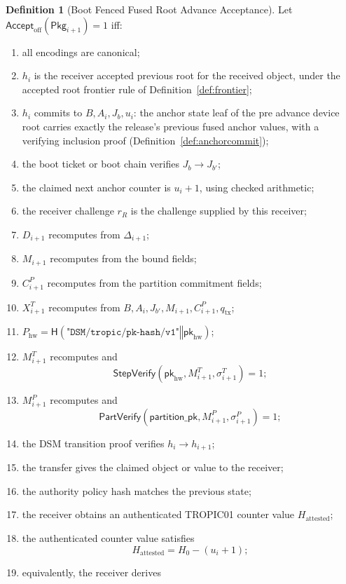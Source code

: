 \documentclass[11pt]{article}
\theoremstyle{definition}
\newtheorem{definition}[theorem]{Definition}
\theoremstyle{remark}
\newcommand{\concat}{\ensuremath{\mathbin{\Vert}}}
\newcommand{\Hf}{\ensuremath{\mathsf{H}}}
\newcommand{\StepVerify}{\ensuremath{\mathsf{StepVerify}}}
\newcommand{\PartVerify}{\ensuremath{\mathsf{PartVerify}}}
\newcommand{\ctx}[1]{\texttt{"#1"}}
\newcommand{\Pkg}{\ensuremath{\mathsf{Pkg}}}
\newcommand{\Bundle}{\ensuremath{B}}
\newcommand{\Ahead}{\ensuremath{A}}
\newcommand{\Bhead}{\ensuremath{J}}
\newcommand{\pkhw}{\ensuremath{\mathsf{pk}_{\mathrm{hw}}}}
\newcommand{\pkh}{\ensuremath{P_{\mathrm{hw}}}}
\begin{document}
\begin{definition}[Boot Fenced Fused Root Advance Acceptance]
Let \(\mathsf{Accept}_{\mathrm{off}}(\Pkg_{i+1})=1\) iff:

\begin{enumerate}[label=(\arabic*),leftmargin=2em]
\item all encodings are canonical;
\item \(h_i\) is the receiver accepted previous root for the received object, under the accepted
root frontier rule of Definition~\ref{def:frontier};
\item \(h_i\) commits to \(\Bundle,\Ahead_i,\Bhead_b,u_i\): the anchor state leaf of the pre
advance device root carries exactly the release's previous fused anchor values, with a verifying
inclusion proof (Definition~\ref{def:anchorcommit});
\item the boot ticket or boot chain verifies \(\Bhead_b\rightarrow\Bhead_{b'}\);
\item the claimed next anchor counter is \(u_i+1\), using checked arithmetic;
\item the receiver challenge \(r_R\) is the challenge supplied by this receiver;
\item \(D_{i+1}\) recomputes from \(\Delta_{i+1}\);
\item \(M_{i+1}\) recomputes from the bound fields;
\item \(C^P_{i+1}\) recomputes from the partition commitment fields;
\item \(X^T_{i+1}\) recomputes from \(\Bundle,\Ahead_i,\Bhead_{b'},M_{i+1},C^P_{i+1},q_{\mathrm{tx}}\);
\item \(\pkh=\Hf(\ctx{DSM/tropic/pk-hash/v1}\concat\pkhw)\);
\item \(M^T_{i+1}\) recomputes and
\[
\StepVerify(\pkhw,M^T_{i+1},\sigma^T_{i+1})=1;
\]
\item \(M^P_{i+1}\) recomputes and
\[
\PartVerify(\mathsf{partition\_pk},M^P_{i+1},\sigma^P_{i+1})=1;
\]
\item the DSM transition proof verifies \(h_i\rightarrow h_{i+1}\);
\item the transfer gives the claimed object or value to the receiver;
\item the authority policy hash matches the previous state;
\item the receiver obtains an authenticated TROPIC01 counter value \(H_{\mathrm{attested}}\);
\item the authenticated counter value satisfies
\[
H_{\mathrm{attested}} = H_0-(u_i+1);
\]
\item equivalently, the receiver derives

\end{enumerate}
\end{definition}
\end{document}
